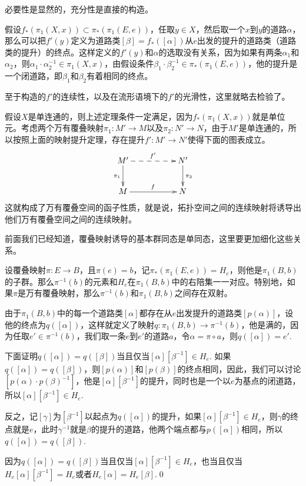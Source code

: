 必要性是显然的，充分性是直接的构造。

假设$f_*(\pi_1(X,x))\subset \pi_*(\pi_1(E,e))$，任取$y\in X$，然后取一个$x$到$y$的道路$\alpha$，那么可以把$f'(y)$定义为道路类$[\beta]=f_*([\alpha])$从$e$出发的提升的道路类（道路类的提升）的终点。这样定义的$f'(y)$和$\alpha$的选取没有关系，因为如果有两条$\alpha_1$和$\alpha_2$，则$\alpha_1\cdot\alpha_2^{-1}\in \pi_1(X,x)$，由假设条件$\beta_1\cdot\beta_2^{-1}\in \pi_*(\pi_1(E,e))$，他的提升是一个闭道路，即$\beta_1$和$\beta_2$有着相同的终点。

至于构造的$f'$的连续性，以及在流形语境下的$f'$的光滑性，这里就略去检验了。

\para 假设$X$是单连通的，则上述定理条件一定满足，因为$f_*(\pi_1(X,x))$就是单位元。考虑两个万有覆叠映射$\pi_1:M'\to M$以及$\pi_2:N'\to N$，由于$M'$是单连通的，所以按照上面的映射提升定理，存在提升$f':M'\to N'$使得下面的图表成立。
\[
\xymatrix{
	M'\ar@{-->}[rr]^{f'} \ar[d]_{\pi_1}&&N' \ar[d]^{\pi_2}\\
	M\ar[rr]^{f}&& N
}
\]
这就构成了万有覆叠空间的函子性质，就是说，拓扑空间之间的连续映射将诱导出他们万有覆叠空间之间的连续映射。

前面我们已经知道，覆叠映射诱导的基本群同态是单同态，这里要更加细化这些关系。

\pro 设覆叠映射$\pi:E\to B$，且$\pi(e)=b$，记$\pi_*(\pi_1(E,e))=H_e$，则他是$\pi_1(B,b)$的子群。那么$\pi^{-1}(b)$的元素和$H_e$在$\pi_1(B,b)$中的右陪集一一对应。特别地，如果$\pi$是万有覆叠映射，那么$\pi^{-1}(b)$和$\pi_1(B,b)$之间存在双射。

\proof 由于$\pi_1(B,b)$中的每一个道路类$[\alpha]$都存在从$e$出发提升的道路类$[p(\alpha)]$，设他的终点为$q([\alpha])$，这样就定义了映射$q:\pi_1(B,b)\to \pi^{-1}(b)$，他是满的，因为任取$e'\in \pi^{-1}(b)$，我们取一条$e$到$e'$的道路$a$，令$\alpha=\pi\circ a$，则$q([\alpha])=e'$.

下面证明$q([\alpha])=q([\beta])$当且仅当$[\alpha][\beta^{-1}]\in H_e$. 如果$q([\alpha])=q([\beta])$，则$[p(\alpha)]$和$[p(\beta)]$的终点相同，因此，我们可以讨论$[p(\alpha)\cdot p(\beta)^{-1}]$，他是$[\alpha][\beta^{-1}]$的提升，同时也是一个以$e$为基点的闭道路，所以$[\alpha][\beta^{-1}]\in H_e$.

反之，记$[\gamma]$为$[\beta^{-1}]$以起点为$q([\alpha])$的提升，如果$[\alpha][\beta^{-1}]\in H_e$，则$\gamma$的终点就是$e$，此时$\gamma^{-1}$就是$\beta$的提升的道路，他两个端点都与$p([\alpha])$相同，所以$q([\alpha])=q([\beta])$.

因为$q([\alpha])=q([\beta])$当且仅当$[\alpha][\beta^{-1}]\in H_e$，也当且仅当$H_e[\alpha][\beta^{-1}]=H_e$或者$H_e[\alpha]=H_e[\beta]$.\qed

